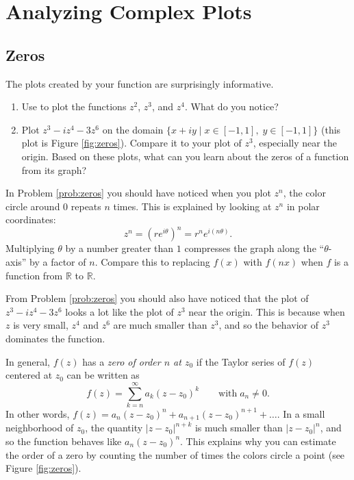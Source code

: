 \section*{Analyzing Complex Plots}

\subsection*{Zeros}

The plots created by your function  are surprisingly informative.

\begin{problem}\label{prob:zeros}
\leavevmode
\begin{enumerate}
\item Use  to plot the functions $z^2$, $z^3$, and $z^4$. What do you notice?
\item Plot $z^3 - iz^4 - 3z^6$ on the domain $\{x+iy \mid x \in [-1,1] , \; y \in [-1,1]\}$ (this plot is Figure \ref{fig:zeros}). 
Compare it to your plot of $z^3$, especially near the origin.
Based on these plots, what can you learn about the zeros of a function from its graph?
\end{enumerate}
\end{problem}

In Problem \ref{prob:zeros} you should have noticed when you plot $z^n$, the color circle around 0 repeats $n$ times. 
This is explained by looking at $z^n$ in polar coordinates:
\[
z^n = (re^{i \theta})^n = r^n e^{i(n\theta)}.
\]
Multiplying $\theta$ by a number greater than $1$ compresses the graph along the ``$\theta$-axis'' by a factor of $n$. 
Compare this to replacing $f(x)$ with $f(nx)$ when $f$ is a function from $\mathbb{R}$ to $\mathbb{R}$.

From Problem \ref{prob:zeros} you should also have noticed that the plot of $z^3 - iz^4 - 3z^6$ looks a lot like the plot of $z^3$ near the origin.
This is because when $z$ is very small, $z^4$ and $z^6$ are much smaller than $z^3$, and so the behavior of $z^3$ dominates the function.

In general, $f(z)$ has a \emph{zero of order $n$ at $z_0$} if the Taylor series of $f(z)$ centered at $z_0$ can be written as 
\[
f(z) = \sum_{k=n}^{\infty} a_k(z-z_0)^k \qquad \text{with} \; a_n \neq 0.
\]
In other words, $f(z) = a_n(z-z_0)^n + a_{n+1}(z-z_0)^{n+1} + \ldots$. 
In a small neighborhood of $z_0$, the quantity $|z-z_0|^{n+k}$ is much smaller than $|z-z_0|^n$, and so the function behaves like $a_n(z-z_0)^n$.
This explains why you can estimate the order of a zero by counting the number of times the colors circle a point (see Figure \ref{fig:zeros}).

